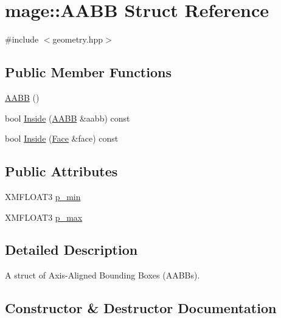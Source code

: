\hypertarget{structmage_1_1_a_a_b_b}{}\section{mage\+:\+:A\+A\+BB Struct Reference}
\label{structmage_1_1_a_a_b_b}


{\ttfamily \#include $<$geometry.\+hpp$>$}

\subsection*{Public Member Functions}
\begin{DoxyCompactItemize}
\item 
\hyperlink{structmage_1_1_a_a_b_b_ae6db94dcb9165eb008f0be8741f0eb62}{A\+A\+BB} ()
\item 
bool \hyperlink{structmage_1_1_a_a_b_b_ad1c2ec1aab58a383219ba1082e72b020}{Inside} (\hyperlink{structmage_1_1_a_a_b_b}{A\+A\+BB} \&aabb) const
\item 
bool \hyperlink{structmage_1_1_a_a_b_b_ad8b5d30287d5dcb98ad2dfcfb90c5e22}{Inside} (\hyperlink{structmage_1_1_face}{Face} \&face) const
\end{DoxyCompactItemize}
\subsection*{Public Attributes}
\begin{DoxyCompactItemize}
\item 
X\+M\+F\+L\+O\+A\+T3 \hyperlink{structmage_1_1_a_a_b_b_aca78eb314738b73f2d21dcf75130b6eb}{p\+\_\+min}
\item 
X\+M\+F\+L\+O\+A\+T3 \hyperlink{structmage_1_1_a_a_b_b_aa5c60af6413a01158acd81d67ebe828c}{p\+\_\+max}
\end{DoxyCompactItemize}


\subsection{Detailed Description}
A struct of Axis-\/\+Aligned Bounding Boxes (A\+A\+B\+Bs). 

\subsection{Constructor \& Destructor Documentation}
\hypertarget{structmage_1_1_a_a_b_b_ae6db94dcb9165eb008f0be8741f0eb62}{}\label{structmage_1_1_a_a_b_b_ae6db94dcb9165eb008f0be8741f0eb62} 
